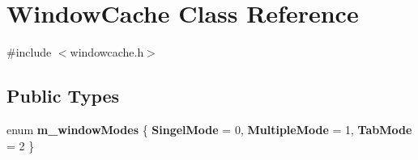 \hypertarget{classWindowCache}{
\section{WindowCache Class Reference}
\label{classWindowCache}
}


{\ttfamily \#include $<$windowcache.h$>$}

\subsection*{Public Types}
\begin{DoxyCompactItemize}
\item 
enum {\bfseries m\_\-windowModes} \{ {\bfseries SingelMode} =  0, 
{\bfseries MultipleMode} =  1, 
{\bfseries TabMode} =  2
 \}
\end{DoxyCompactItemize}
